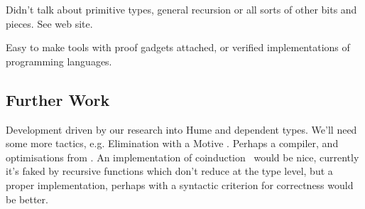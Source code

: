 Didn't talk about primitive types, general recursion or all sorts of
other bits and pieces. See web site.

Easy to make tools with proof gadgets attached, or verified
implementations of programming languages.

\subsection{Further Work}

Development driven by our research into Hume and dependent types.
We'll need some more tactics, e.g. Elimination with a Motive
\cite{elim-motive}. Perhaps a compiler, and optimisations from
\cite{brady-thesis}. An implementation of
coinduction~\cite{coinductive} would be nice, currently it's faked by
recursive functions which don't reduce at the type level, but a proper
implementation, perhaps with a syntactic criterion for correctness
would be better.
